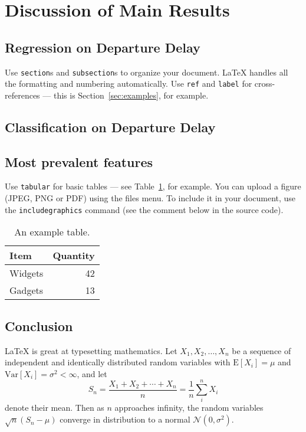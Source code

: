 \documentclass[twocolumn,showpacs,%
  nofootinbib,aps,superscriptaddress,%
  eqsecnum,prd,notitlepage,showkeys,10pt]{revtex4-1}
\begin{document}
\section{Discussion of Main Results}

\subsection{Regression on Departure Delay}



Use \texttt{section}s and \texttt{subsection}s to organize your document. \LaTeX{} handles all the formatting and numbering automatically. Use \texttt{ref} and \texttt{label} for cross-references --- this is Section~\ref{sec:examples}, for example.

\subsection{Classification on Departure Delay}


\subsection{Most prevalent features}
Use \texttt{tabular} for basic tables --- see Table~\ref{tab:widgets}, for example. You can upload a figure (JPEG, PNG or PDF) using the files menu. To include it in your document, use the \texttt{includegraphics} command (see the comment below in the source code).


\begin{table}
\centering
\begin{tabular}{l|r}
Item & Quantity \\\hline
Widgets & 42 \\
Gadgets & 13
\end{tabular}
\caption{\label{tab:widgets}An example table.}
\end{table}

\subsection{Conclusion}

\LaTeX{} is great at typesetting mathematics. Let $X_1, X_2, \ldots, X_n$ be a sequence of independent and identically distributed random variables with $\text{E}[X_i] = \mu$ and $\text{Var}[X_i] = \sigma^2 < \infty$, and let
$$S_n = \frac{X_1 + X_2 + \cdots + X_n}{n}
      = \frac{1}{n}\sum_{i}^{n} X_i$$
denote their mean. Then as $n$ approaches infinity, the random variables $\sqrt{n}(S_n - \mu)$ converge in distribution to a normal $\mathcal{N}(0, \sigma^2)$.
\end{document}
